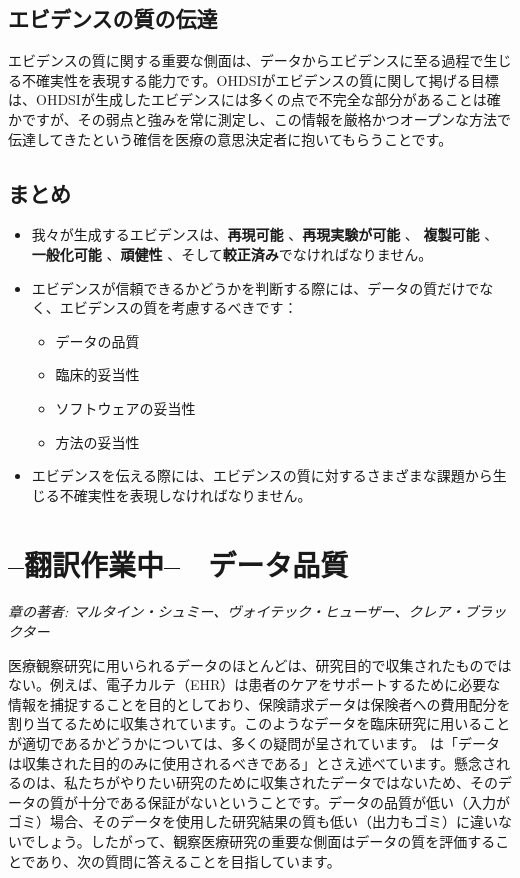 \documentclass[
  11pt]{book}
\makeatletter
\providecommand{\tightlist}{%
  \setlength{\itemsep}{0pt}\setlength{\parskip}{0pt}}
\newenvironment{kframe}{%
\medskip{}
\setlength{\fboxsep}{.8em}
 \def\at@end@of@kframe{}%
 \ifinner\ifhmode%
  \def\at@end@of@kframe{\end{minipage}}%
  \begin{minipage}{\columnwidth}%
 \fi\fi%
 \def\FrameCommand##1{\hskip\@totalleftmargin \hskip-\fboxsep
 \colorbox{myShadeColor}{##1}\hskip-\fboxsep
     \hskip-\linewidth \hskip-\@totalleftmargin \hskip\columnwidth}%
 \MakeFramed {\advance\hsize-\width
   \@totalleftmargin\z@ \linewidth\hsize
   \@setminipage}}%
 {\par\unskip\endMakeFramed%
 \at@end@of@kframe}
\newenvironment{rmdblock}[1]
  {
  \begin{itemize}
  \renewcommand{\labelitemi}{
    \raisebox{-.7\height}[0pt][0pt]{
      {\setkeys{Gin}{width=3em,keepaspectratio}\texttt{[image: images/\#1]}}
    }
  }
  \setlength{\fboxsep}{1em}
  \begin{kframe}
  \item
  }
  {
  \end{kframe}
  \end{itemize}
  }
\newenvironment{rmdsummary}
  {\begin{rmdblock}{summary}}
  {\end{rmdblock}}
\theoremstyle{definition}
\theoremstyle{definition}
\theoremstyle{definition}
\theoremstyle{definition}
\theoremstyle{remark}
\makeatother
\begin{document}
\section{エビデンスの質の伝達}\label{ux30a8ux30d3ux30c7ux30f3ux30b9ux306eux8ceaux306eux4f1dux9054}

エビデンスの質に関する重要な側面は、データからエビデンスに至る過程で生じる不確実性を表現する能力です。OHDSIがエビデンスの質に関して掲げる目標は、OHDSIが生成したエビデンスには多くの点で不完全な部分があることは確かですが、その弱点と強みを常に測定し、この情報を厳格かつオープンな方法で伝達してきたという確信を医療の意思決定者に抱いてもらうことです。

\section{まとめ}\label{ux307eux3068ux3081-11}

\begin{rmdsummary}
\begin{itemize}
\item
  我々が生成するエビデンスは、\textbf{再現可能} 、\textbf{再現実験が可能} 、 \textbf{複製可能} 、\textbf{一般化可能} 、\textbf{頑健性} 、そして\textbf{較正済み}でなければなりません。
\item
  エビデンスが信頼できるかどうかを判断する際には、データの質だけでなく、エビデンスの質を考慮するべきです：

  \begin{itemize}
  \tightlist
  \item
    データの品質
  \item
    臨床的妥当性
  \item
    ソフトウェアの妥当性
  \item
    方法の妥当性
  \end{itemize}
\item
  エビデンスを伝える際には、エビデンスの質に対するさまざまな課題から生じる不確実性を表現しなければなりません。
\end{itemize}
\end{rmdsummary}

\chapter{--翻訳作業中--　データ品質}\label{DataQuality}

\emph{章の著者: マルタイン・シュミー、ヴォイテック・ヒューザー、クレア・ブラックター}

医療観察研究に用いられるデータのほとんどは、研究目的で収集されたものではない。例えば、電子カルテ（EHR）は患者のケアをサポートするために必要な情報を捕捉することを目的としており、保険請求データは保険者への費用配分を割り当てるために収集されています。このようなデータを臨床研究に用いることが適切であるかどうかについては、多くの疑問が呈されています。\citet{vanDerLei_1991} は「データは収集された目的のみに使用されるべきである」とさえ述べています。懸念されるのは、私たちがやりたい研究のために収集されたデータではないため、そのデータの質が十分である保証がないということです。データの品質が低い（入力がゴミ）場合、そのデータを使用した研究結果の質も低い（出力もゴミ）に違いないでしょう。したがって、観察医療研究の重要な側面はデータの質を評価することであり、次の質問に答えることを目指しています。
\end{document}
